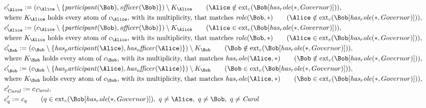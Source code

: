 \begin{align*}
&
c'_
{
\Alice
}
 := 
(c_
{
\Alice
}
 \setminus 
\{
\mathit{
participant
}
(
\Bob
)
,
\mathit{
officer
}
(
\Bob
)
\}
) \setminus K_
{
\Alice
}
 \qquad (
\Alice
 \notin 
\mathrm{ext}_c(
\Bob
[
\mathit{
has_role
}
(
\ast
,
Governor
)
]
)
)
,\\
&
\text{where } K_
{
\Alice
}
 \text{ holds every atom of } c_
{
\Alice
}
 \text{, with its multiplicity, that matches } 
\mathit{
role
}
(
\Bob
,
\ast
)
 \qquad (
\Alice
 \notin 
\mathrm{ext}_c(
\Bob
[
\mathit{
has_role
}
(
\ast
,
Governor
)
]
)
)
,\\
&
c'_
{
\Alice
}
 := 
(c_
{
\Alice
}
 \setminus 
\{
\mathit{
participant
}
(
\Bob
)
,
\mathit{
officer
}
(
\Bob
)
\}
) \setminus K_
{
\Alice
}
 \qquad (
\Alice
 \in 
\mathrm{ext}_c(
\Bob
[
\mathit{
has_role
}
(
\ast
,
Governor
)
]
)
)
,\\
&
\text{where } K_
{
\Alice
}
 \text{ holds every atom of } c_
{
\Alice
}
 \text{, with its multiplicity, that matches } 
\mathit{
role
}
(
\Bob
,
\ast
)
 \qquad (
\Alice
 \in 
\mathrm{ext}_c(
\Bob
[
\mathit{
has_role
}
(
\ast
,
Governor
)
]
)
)
,\\
&
c'_
{
\Bob
}
 := 
(c_
{
\Bob
}
 \setminus 
\{
\mathit{
has_participant
}
(
\Alice
)
,
\mathit{
has_officer
}
(
\Alice
)
\}
) \setminus K_
{
\Bob
}
 \qquad (
\Bob
 \notin 
\mathrm{ext}_c(
\Bob
[
\mathit{
has_role
}
(
\ast
,
Governor
)
]
)
)
,\\
&
\text{where } K_
{
\Bob
}
 \text{ holds every atom of } c_
{
\Bob
}
 \text{, with its multiplicity, that matches } 
\mathit{
has_role
}
(
\Alice
,
\ast
)
 \qquad (
\Bob
 \notin 
\mathrm{ext}_c(
\Bob
[
\mathit{
has_role
}
(
\ast
,
Governor
)
]
)
)
,\\
&
c'_
{
\Bob
}
 := 
(c_
{
\Bob
}
 \setminus 
\{
\mathit{
has_participant
}
(
\Alice
)
,
\mathit{
has_officer
}
(
\Alice
)
\}
) \setminus K_
{
\Bob
}
 \qquad (
\Bob
 \in 
\mathrm{ext}_c(
\Bob
[
\mathit{
has_role
}
(
\ast
,
Governor
)
]
)
)
,\\
&
\text{where } K_
{
\Bob
}
 \text{ holds every atom of } c_
{
\Bob
}
 \text{, with its multiplicity, that matches } 
\mathit{
has_role
}
(
\Alice
,
\ast
)
 \qquad (
\Bob
 \in 
\mathrm{ext}_c(
\Bob
[
\mathit{
has_role
}
(
\ast
,
Governor
)
]
)
)
,\\
&
c'_
{
\mathit{Carol}
}
 := 
c_
{
\mathit{Carol}
}
,\\
&
c'_
q
 := 
c_
q
 \qquad (
q
 \in 
\mathrm{ext}_c(
\Bob
[
\mathit{
has_role
}
(
\ast
,
Governor
)
]
)
,\ 
q \neq 
\Alice
,\ 
q \neq 
\Bob
,\ 
q \neq 
\mathit{Carol}

\end{align*}
